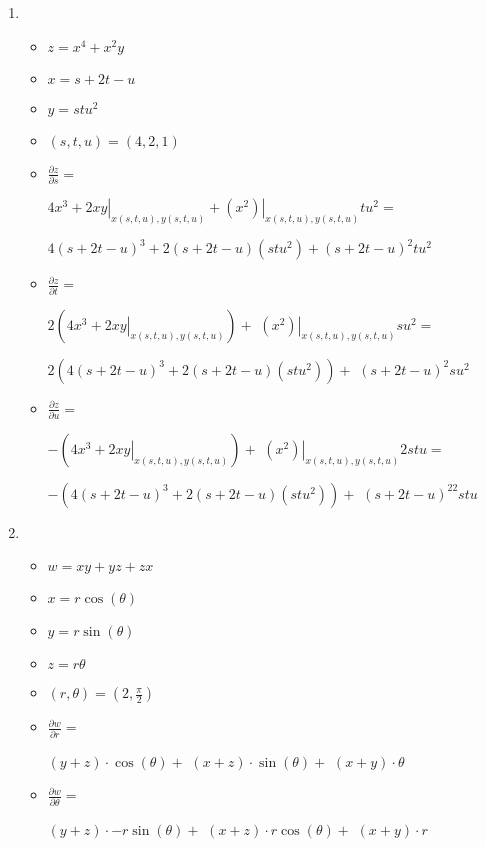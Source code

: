 \documentclass[../practica_04.tex]{subfiles}
\begin{document}
    \begin{enumerate}
        \item 
            \begin{itemize}
                \item $ z = x^4 + x^2y $
                \item $ x = s + 2t - u $
                \item $ y = stu^2 $
                \item $ (s,t,u) = (4,2,1) $
                \item $\frac{\partial z}{\partial s} = $

                    $ \left. 4x^3 + 2xy \right|_{x(s,t,u),y(s,t,u)} + \left. (x^2) \right|_{x(s,t,u),y(s,t,u)} tu^2 = $

                    $ 4(s+2t-u)^3 + 2(s+2t-u)(stu^2) + (s+2t-u)^2tu^2 $

                \item $\frac{\partial z}{\partial t} = $

                    $ 2(\left. 4x^3 + 2xy \right|_{x(s,t,u),y(s,t,u)}) + $
                    $\left. (x^2) \right|_{x(s,t,u),y(s,t,u)} su^2 = $

                    $ 2(4(s+2t-u)^3 + 2(s+2t-u)(stu^2)) + $
                    $ (s+2t-u)^2su^2 $

                \item $\frac{\partial z}{\partial u} = $

                    $ -(\left. 4x^3 + 2xy \right|_{x(s,t,u),y(s,t,u)}) + $
                    $\left. (x^2) \right|_{x(s,t,u),y(s,t,u)} 2stu = $

                    $ -(4(s+2t-u)^3 + 2(s+2t-u)(stu^2)) + $
                    $ (s+2t-u)^22stu $
            \end{itemize}
        \item
            \begin{itemize}
                \item $ w = xy + yz + zx $
                \item $ x = r\cos(\theta) $
                \item $ y = r\sin(\theta) $
                \item $ z = r\theta $
                \item $ (r,\theta) = (2,\frac{\pi}{2}) $
                \item $\frac{\partial w}{\partial r} = $
                
                    $ (y + z) \cdot \cos(\theta) + $
                    $ (x + z) \cdot \sin(\theta) + $
                    $ (x + y) \cdot \theta $

                \item $\frac{\partial w}{\partial \theta} = $

                    $ (y + z) \cdot -r\sin(\theta) + $
                    $ (x + z) \cdot r\cos(\theta) + $
                    $ (x + y) \cdot r $

            \end{itemize}
    \end{enumerate}
\end{document}
